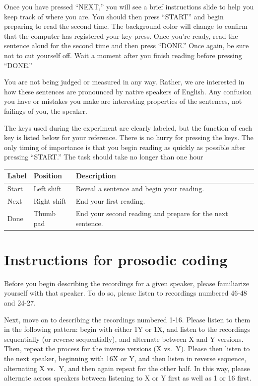 \documentclass[11pt,oneside]{book}
\begin{document}
Once you have pressed ``NEXT,'' you will see a brief instructions slide to help you keep track of where you are. You should then press ``START'' and begin preparing to read the second time. The background color will change to confirm that the computer has registered your key press. Once you're ready, read the sentence aloud for the second time and then press ``DONE.'' Once again, be sure not to cut yourself off. Wait a moment after you finish reading before pressing ``DONE.''

You are not being judged or measured in any way. Rather, we are interested in how these sentences are pronounced by native speakers of English. Any confusion you have or mistakes you make are interesting properties of the sentences, not failings of you, the speaker.

The keys used during the experiment are clearly labeled, but the function of each key is listed below for your reference. There is no hurry for pressing the keys. The only timing of importance is that you begin reading as quickly as possible after pressing ``START.'' The task should take no longer than one hour

\begin{table}[!h]
\centering
\begin{tabular}{lll}
\toprule
Label & Position & Description\\
\midrule
Start & Left shift & Reveal a sentence and begin your reading.\\
Next & Right shift & End your first reading.\\
Done & Thumb pad & End your second reading and prepare for the next sentence.\\
\bottomrule
\end{tabular}
\end{table}

\newpage

\hypertarget{RA}{%
\chapter{Instructions for prosodic coding}\label{RA}}

Before you begin describing the recordings for a given speaker, please familiarize yourself with that speaker. To do so, please listen to recordings numbered 46-48 and 24-27.

Next, move on to describing the recordings numbered 1-16. Please listen to them in the following pattern: begin with either 1Y or 1X, and listen to the recordings sequentially (or reverse sequentially), and alternate between X and Y versions. Then, repeat the process for the inverse versions (X vs.~Y). Please then listen to the next speaker, beginning with 16X or Y, and then listen in reverse sequence, alternating X vs.~Y, and then again repeat for the other half. In this way, please alternate across speakers between listening to X or Y first as well as 1 or 16 first.
\end{document}
